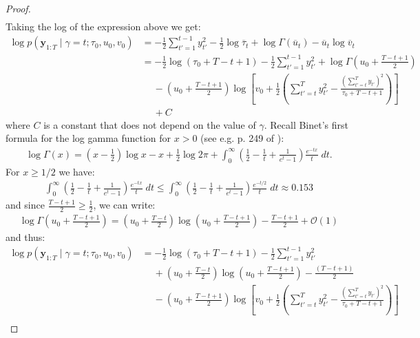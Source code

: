 \begin{proof}
\begin{align*}
\end{align*}
Taking the log of the expression above we get:
\begin{align*}
    \log p(\mathbf{y}_{1:T} \;|\; \gamma = t; \tau_0,u_0,v_0) &= -\frac{1}{2}\sum_{t'=1}^{t-1} y_{t'}^2 - \frac{1}{2} \log \overline{\tau}_t + \log \Gamma(\overline{u}_t) - \overline{u}_t\log \overline{v}_t \\
    &= -\frac{1}{2}\log(\tau_0 + T - t + 1) - \frac{1}{2}\sum_{t'=1}^{t-1} y_{t'}^2 + \log \Gamma\left(u_0 + \frac{T - t +1}{2}\right)  \\
    &\quad\: - \left(u_0 + \frac{T - t +1}{2}\right)\log\left[v_0 +\frac{1}{2}\left(\sum_{t'=t}^T y_{t'}^2 - \frac{\left(\sum_{t'=t}^T y_{t'}\right)^2 }{\tau_0 + T- t +1}\right)\right] \\
    &\quad\: + C
\end{align*}
where $C$ is a constant that does not depend on the value of $\gamma$. Recall Binet's first formula for the log gamma function for $x > 0$ (see e.g. p. 249 of \citealp{Whittaker96}): 
\begin{align*}
    \log \Gamma(x) = \left(x - \frac{1}{2}\right) \log x - x + \frac{1}{2} \log 2 \pi + \int_{0}^\infty\left(\frac{1}{2} - \frac{1}{t} + \frac{1}{e^t - 1} \right)\frac{e^{-tx}}{t} \;dt.
\end{align*}
For $x \geq 1/2$ we have:
\begin{align*}
    \int_{0}^\infty\left(\frac{1}{2} - \frac{1}{t} + \frac{1}{e^t - 1} \right)\frac{e^{-tx}}{t} \;dt \leq \int_{0}^\infty\left(\frac{1}{2} - \frac{1}{t} + \frac{1}{e^t - 1} \right)\frac{e^{-t/2}}{t} \;dt \approx 0.153
\end{align*}
and since $\frac{T-t+1}{2} \geq \frac{1}{2}$, we can write:
\begin{align*}
    \log \Gamma\left(u_0 + \frac{T - t +1}{2}\right) = \left(u_0 + \frac{T - t}{2}\right) \log\left(u_0 + \frac{T - t +1}{2}\right) - \frac{T - t +1}{2} +\mathcal{O}(1)
\end{align*}
and thus:
\small
\begin{align*}
    \log p(\mathbf{y}_{1:T} \;|\; \gamma = t; \tau_0,u_0,v_0) &= -\frac{1}{2}\log(\tau_0 + T - t + 1) - \frac{1}{2}\sum_{t'=1}^{t-1} y_{t'}^2  \\
    &\quad\: +\left(u_0 + \frac{T-t}{2}\right) \log \left(u_0 + \frac{T-t+1}{2}\right) - \frac{(T-t+1)}{2}  \\
    &\quad\: - \left(u_0 + \frac{T - t +1}{2}\right)\log\left[v_0 +\frac{1}{2}\left(\sum_{t'=t}^T y_{t'}^2 - \frac{\left(\sum_{t'=t}^T y_{t'}\right)^2}{\tau_0 + T- t +1}\right) \right] \\

\end{align*}
\end{proof}
